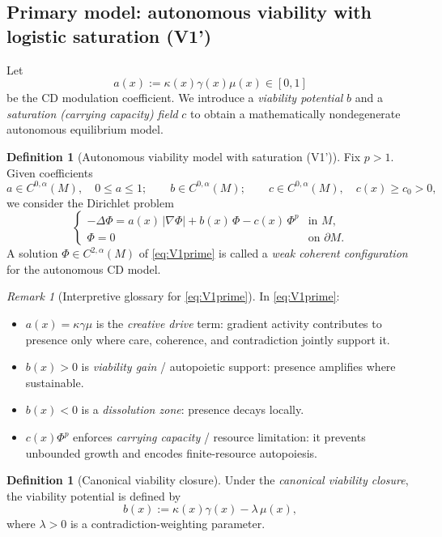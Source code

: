 \documentclass[11pt]{article}
\theoremstyle{plain}
\theoremstyle{definition}
\newtheorem{definition}[theorem]{Definition}
\theoremstyle{remark}
\newtheorem{remark}[theorem]{Remark}
\begin{document}
\subsection{Primary model: autonomous viability with logistic saturation (V1')}
Let
\[
a(x) := \kappa(x)\gamma(x)\mu(x)\in[0,1]
\]
be the CD modulation coefficient. We introduce a \emph{viability potential} \(b\) and a \emph{saturation (carrying capacity) field} \(c\) to obtain a mathematically nondegenerate autonomous equilibrium model.

\begin{definition}[Autonomous viability model with saturation (V1')]\label{def:V1prime}
Fix \(p>1\). Given coefficients
\[
a\in C^{0,\alpha}(M),\quad 0\le a\le 1;\qquad
b\in C^{0,\alpha}(M);\qquad
c\in C^{0,\alpha}(M),\quad c(x)\ge c_0>0,
\]
we consider the Dirichlet problem
\begin{equation}\label{eq:V1prime}
\begin{cases}
-\Delta \Phi = a(x)\,|\nabla \Phi| + b(x)\,\Phi - c(x)\,\Phi^{p} & \text{in }M,\\
\Phi=0 & \text{on }\partial M.
\end{cases}
\end{equation}
A solution \(\Phi\in C^{2,\alpha}(M)\) of \eqref{eq:V1prime} is called a \emph{weak coherent configuration} for the autonomous CD model.
\end{definition}

\begin{remark}[Interpretive glossary for \eqref{eq:V1prime}]
In \eqref{eq:V1prime}:
\begin{itemize}
\item \(a(x)=\kappa\gamma\mu\) is the \emph{creative drive} term: gradient activity contributes to presence only where care, coherence, and contradiction jointly support it.
\item \(b(x)>0\) is \emph{viability gain} / autopoietic support: presence amplifies where sustainable.
\item \(b(x)<0\) is a \emph{dissolution zone}: presence decays locally.
\item \(c(x)\Phi^p\) enforces \emph{carrying capacity} / resource limitation: it prevents unbounded growth and encodes finite-resource autopoiesis.
\end{itemize}
\end{remark}

\begin{definition}[Canonical viability closure]\label{def:canonicalClosure}
Under the \emph{canonical viability closure}, the viability potential is defined by
\begin{equation}\label{eq:canonicalb}
b(x) := \kappa(x)\gamma(x) - \lambda\,\mu(x),
\end{equation}
where \(\lambda>0\) is a contradiction-weighting parameter.
\end{definition}
\end{document}
